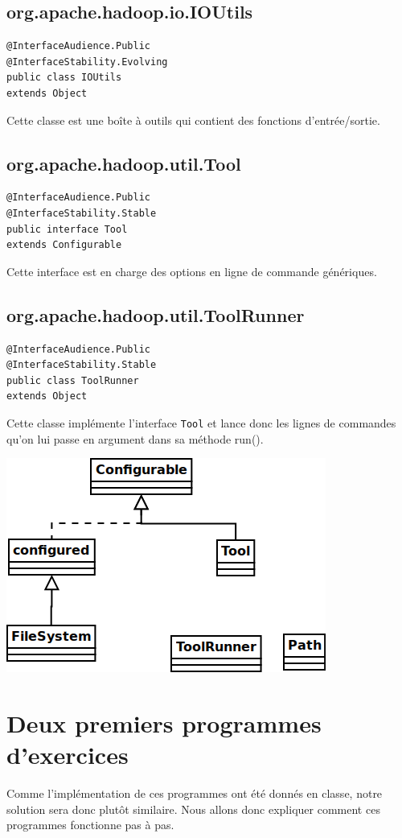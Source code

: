 \documentclass[a4paper]{article}
\begin{document}
\subsection{org.apache.hadoop.io.IOUtils}
\label{sec:orgheadline5}
\begin{lstlisting}
@InterfaceAudience.Public
@InterfaceStability.Evolving
public class IOUtils
extends Object
\end{lstlisting}
Cette classe est une boîte à outils qui contient des fonctions d'entrée/sortie.
\subsection{org.apache.hadoop.util.Tool}
\label{sec:orgheadline6}
\begin{lstlisting}
@InterfaceAudience.Public
@InterfaceStability.Stable
public interface Tool
extends Configurable
\end{lstlisting}
Cette interface est en charge des options en ligne de commande génériques.
\subsection{org.apache.hadoop.util.ToolRunner}
\label{sec:orgheadline7}
\begin{lstlisting}
@InterfaceAudience.Public
@InterfaceStability.Stable
public class ToolRunner
extends Object
\end{lstlisting}
Cette classe implémente l'interface \verb?Tool? et lance donc les lignes de commandes qu'on lui passe en argument dans sa méthode run().

\includegraphics[width=.9\linewidth]{diagram.png}

\section{Deux premiers programmes d'exercices}
\label{sec:orgheadline11}
Comme l'implémentation de ces programmes ont été donnés en classe, notre solution sera donc plutôt similaire.
Nous allons donc expliquer comment ces programmes fonctionne pas à pas.
\end{document}
